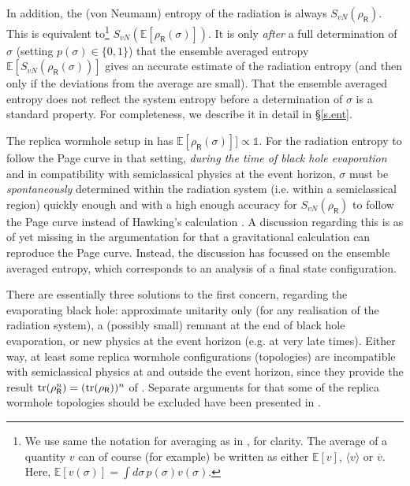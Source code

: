 \documentclass[12pt]{article}
\numberwithin{equation}{section}
\begin{document}
\begin{enumerate}
In addition, the (von Neumann) entropy of the radiation is always $S_{vN}(\rho_\textsf{R})$. This is equivalent to\footnote{We use same the notation for averaging as in \cite{Stanford:2020wkf}, for clarity. The average of a quantity $v$ can of course (for example) be written as either $\mathbb{E}[v]$, $\langle v\rangle$ or $\overline{v}$. Here, $\mathbb{E}[v(\sigma)]=\int d\sigma\, p(\sigma)v(\sigma)$.} $S_{vN}(\mathbb{E}[\rho_\textsf{R}(\sigma)])$. It is only \emph{after} a full determination of $\sigma$ (setting $p(\sigma)\in\{0,1\}$) that the ensemble averaged entropy $\mathbb{E}[S_{vN}(\rho_\textsf{R}(\sigma))]$ gives an accurate estimate of the radiation entropy (and then only if the deviations from the average are small). That the ensemble averaged entropy does not reflect the system entropy before a determination of $\sigma$ is a standard property. For completeness, we describe it in detail in \S\ref{s.ent}.

The replica wormhole setup in \cite{Penington:2019kki} has $\mathbb{E}[\rho_\textsf{R}(\sigma)]]\propto\mathbb{1}$. For the radiation entropy to follow the Page curve in that setting, {\it during the time of black hole evaporation} and in compatibility with semiclassical physics at the event horizon, $\sigma$ must be \emph{spontaneously} determined within the radiation system (i.e. within a semiclassical region) quickly enough and with a high enough accuracy for $S_{vN}(\rho_\textsf{R})$ to follow the Page curve instead of Hawking's calculation \cite{Hawking:1976ra}. A discussion regarding this is as of yet missing in the argumentation for that a gravitational calculation can reproduce the Page curve. Instead, the discussion has focussed on the ensemble averaged entropy, which corresponds to an analysis of a final state configuration.
\end{enumerate}

There are essentially three solutions to the first concern, regarding the evaporating black hole: approximate unitarity only (for any realisation of the radiation system), a (possibly small) remnant at the end of black hole evaporation, or new physics at the event horizon (e.g. at very late times). Either way, at least some replica wormhole configurations (topologies) are incompatible with semiclassical physics at and outside the event horizon, since they provide the result ${\rm tr}(\rho_\textsf{R}^n)=({\rm tr}(\rho_\textsf{R}))^n$ of \cite{Penington:2019kki,Almheiri:2019qdq}. Separate arguments for that some of the replica wormhole topologies should be excluded have been presented in \cite{Giddings:2020yes}. 
\end{document}
